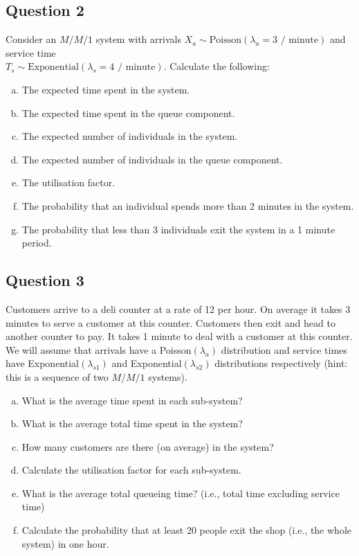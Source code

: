 \subsection*{Question 2}
Consider an $M/M/1$ system with arrivals $X_a \sim \text{Poisson}(\lambda_a=3 \text{ / minute})$ and service time \\$T_s \sim \text{Exponential}(\lambda_s=4 \text{ / minute})$. Calculate the following:\\[-0.2cm]
\begin{enumerate}[(a)]

\item  The expected time spent in the system.  \item  The expected time spent in the queue component.  \item  The expected number of individuals in the system.   \item  The expected number of individuals in the queue component.  \item  The utilisation factor.  \item  The probability that an individual spends more than 2 minutes in the system.  \item  The probability that less than 3 individuals exit the system in a 1 minute period.
\end{enumerate}



\newpage
\subsection*{Question 3}
Customers arrive to a deli counter at a rate of 12 per hour. On average it takes 3 minutes to serve a customer at this counter. Customers then exit and head to another counter to pay. It takes 1 minute to deal with a customer at this counter. We will assume that arrivals have a Poisson$(\lambda_a)$ distribution and service times have Exponential$(\lambda_{s1})$ and Exponential$(\lambda_{s2})$ distributions respectively (hint: this is a sequence of two $M/M/1$ systems).\\[-0.2cm]

\begin{enumerate}[(a)]
\item  What is the average time spent in each sub-system?  \item  What is the average total time spent in the system?  \item  How many customers are there (on average) in the system?   \\\item  Calculate the utilisation factor for each sub-system.  \item  What is the average total queueing time? (i.e., total time excluding service time)  \item  Calculate the probability that at least 20 people exit the shop (i.e., the whole system) in one hour.
\end{enumerate}

